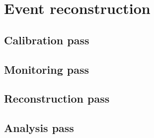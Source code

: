 

\section{Event reconstruction \label{sec:reconstruction}}
\subsection{Calibration pass \label{sec:reccalibration}}
\subsection{Monitoring pass \label{sec:recmonitoring}}
\subsection{Reconstruction pass \label{sec:recreconstruction}}
\subsection{Analysis pass \label{sec:recanalysis}}
